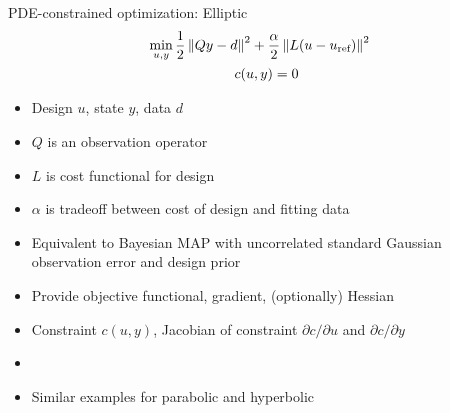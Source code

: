 \begin{frame}{PDE-constrained optimization: Elliptic}
  \begin{gather*}
    \min_{u,y} \frac 1 2 \left\lVert Qy - d \right\rVert^2 + \frac \alpha 2 \left\lVert L(u - u_{\text{ref}}) \right\rVert^2 \\
    \quad c(u,y) = 0
  \end{gather*}
  \begin{itemize}
  \item Design $u$, state $y$, data $d$
  \item $Q$ is an observation operator
  \item $L$ is cost functional for design
  \item $\alpha$ is tradeoff between cost of design and fitting data
  \item Equivalent to Bayesian MAP with uncorrelated standard Gaussian observation error and design prior
  \item Provide objective functional, gradient, (optionally) Hessian
  \item Constraint $c(u,y)$, Jacobian of constraint $\partial c/\partial u$ and $\partial c/\partial y$
  \item {\small {}}
  \item Similar examples for parabolic and hyperbolic
  \end{itemize}
\end{frame}
